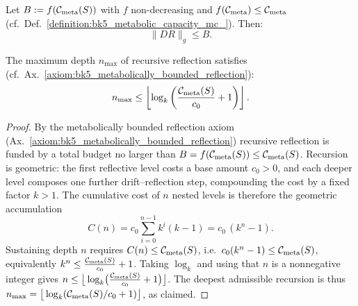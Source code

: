 \begin{axiom}
\label{axiom:bk5_metabolically_bounded_reflection}
Let $B := f(\mathcal{C}_{\text{meta}}(S))$ with $f$ non-decreasing and $f(\mathcal{C}_{\text{meta}}) \leq \mathcal{C}_{\text{meta}}$ (cf.~Def.~\ref{definition:bk5_metabolic_capacity_mc_}). Then:
\[
\| D R \|_g \leq B.
\]
\end{axiom}
\begin{corollary} \label{corollary:bk5__metabolically_bounded_reflection_corollary}
The maximum depth $n_{\max}$ of recursive reflection satisfies (cf.~Ax.~\ref{axiom:bk5_metabolically_bounded_reflection}):
\[
n_{\max} \leq \left\lfloor \log_k\left(\frac{\mathcal{C}_{\text{meta}}(S)}{c_0} + 1\right) \right\rfloor.
\]
\end{corollary}
\begin{proof}
\label{proof:bk5__metabolically_bounded_reflection_corollary}
\leavevmode
By the metabolically bounded reflection axiom (Ax.~\ref{axiom:bk5_metabolically_bounded_reflection}) recursive reflection is funded by a total budget no larger than $B=f(\mathcal{C}_{\text{meta}}(S))\le\mathcal{C}_{\text{meta}}(S)$. Recursion is geometric: the first reflective level costs a base amount $c_0>0$, and each deeper level composes one further drift--reflection step, compounding the cost by a fixed factor $k>1$. The cumulative cost of $n$ nested levels is therefore the geometric accumulation
\[
C(n)=c_0\sum_{i=0}^{n-1}k^{i}(k-1)=c_0\,(k^{n}-1).
\]
Sustaining depth $n$ requires $C(n)\le\mathcal{C}_{\text{meta}}(S)$, i.e.\ $c_0(k^{n}-1)\le\mathcal{C}_{\text{meta}}(S)$, equivalently $k^{n}\le \tfrac{\mathcal{C}_{\text{meta}}(S)}{c_0}+1$. Taking $\log_k$ and using that $n$ is a nonnegative integer gives $n\le\big\lfloor\log_k\!\big(\tfrac{\mathcal{C}_{\text{meta}}(S)}{c_0}+1\big)\big\rfloor$. The deepest admissible recursion is thus $n_{\max}=\big\lfloor\log_k(\mathcal{C}_{\text{meta}}(S)/c_0+1)\big\rfloor$, as claimed.
\end{proof}
